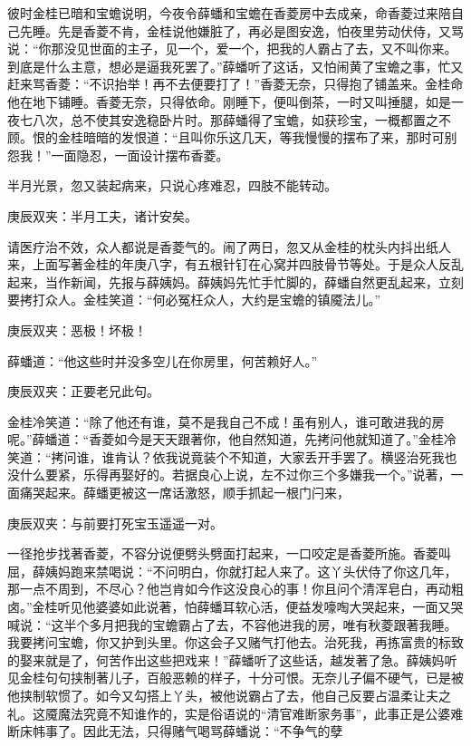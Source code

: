 \begin{parag}
    彼时金桂已暗和宝蟾说明，今夜令薛蟠和宝蟾在香菱房中去成亲，命香菱过来陪自己先睡。先是香菱不肯，金桂说他嫌脏了，再必是图安逸，怕夜里劳动伏侍，又骂说：“你那没见世面的主子，见一个，爱一个，把我的人霸占了去，又不叫你来。到底是什么主意，想必是逼我死罢了。”薛蟠听了这话，又怕闹黄了宝蟾之事，忙又赶来骂香菱：“不识抬举！再不去便要打了！”香菱无奈，只得抱了铺盖来。金桂命他在地下铺睡。香菱无奈，只得依命。刚睡下，便叫倒茶，一时又叫捶腿，如是一夜七八次，总不使其安逸稳卧片时。那薛蟠得了宝蟾，如获珍宝，一概都置之不顾。恨的金桂暗暗的发恨道：“且叫你乐这几天，等我慢慢的摆布了来，那时可别怨我！”一面隐忍，一面设计摆布香菱。
\end{parag}


\begin{parag}
    半月光景，忽又装起病来，只说心疼难忍，四肢不能转动。\begin{note}庚辰双夹：半月工夫，诸计安矣。\end{note}请医疗治不效，众人都说是香菱气的。闹了两日，忽又从金桂的枕头内抖出纸人来，上面写著金桂的年庚八字，有五根针钉在心窝并四肢骨节等处。于是众人反乱起来，当作新闻，先报与薛姨妈。薛姨妈先忙手忙脚的，薛蟠自然更乱起来，立刻要拷打众人。金桂笑道：“何必冤枉众人，大约是宝蟾的镇魇法儿。”\begin{note}庚辰双夹：恶极！坏极！\end{note}薛蟠道：“他这些时并没多空儿在你房里，何苦赖好人。”\begin{note}庚辰双夹：正要老兄此句。\end{note}金桂冷笑道：“除了他还有谁，莫不是我自己不成！虽有别人，谁可敢进我的房呢。”薛蟠道：“香菱如今是天天跟著你，他自然知道，先拷问他就知道了。”金桂冷笑道：“拷问谁，谁肯认？依我说竟装个不知道，大家丢开手罢了。横竖治死我也没什么要紧，乐得再娶好的。若据良心上说，左不过你三个多嫌我一个。”说著，一面痛哭起来。薛蟠更被这一席话激怒，顺手抓起一根门闩来，\begin{note}庚辰双夹：与前要打死宝玉遥遥一对。\end{note}一径抢步找著香菱，不容分说便劈头劈面打起来，一口咬定是香菱所施。香菱叫屈，薛姨妈跑来禁喝说：“不问明白，你就打起人来了。这丫头伏侍了你这几年，那一点不周到，不尽心？他岂肯如今作这没良心的事！你且问个清浑皂白，再动粗卤。”金桂听见他婆婆如此说著，怕薛蟠耳软心活，便益发嚎啕大哭起来，一面又哭喊说：“这半个多月把我的宝蟾霸占了去，不容他进我的房，唯有秋菱跟著我睡。我要拷问宝蟾，你又护到头里。你这会子又赌气打他去。治死我，再拣富贵的标致的娶来就是了，何苦作出这些把戏来！”薛蟠听了这些话，越发著了急。薛姨妈听见金桂句句挟制著儿子，百般恶赖的样子，十分可恨。无奈儿子偏不硬气，已是被他挟制软惯了。如今又勾搭上丫头，被他说霸占了去，他自己反要占温柔让夫之礼。这魇魔法究竟不知谁作的，实是俗语说的“清官难断家务事”，此事正是公婆难断床帏事了。因此无法，只得赌气喝骂薛蟠说：“不争气的孽
\end{parag}
